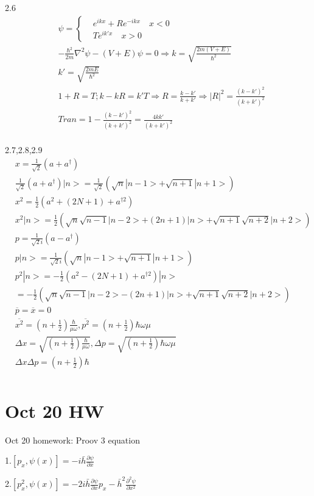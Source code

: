 \documentclass{article}
\begin{document}
  2.6\begin{align*}
  & \psi=\begin{cases}
    &e^{ikx}+Re^{-ikx}\quad x<0\\
    &Te^{ik'x} \quad x>0
  \end{cases}\\
  &-\frac{\hbar^2}{2m}\nabla^2 \psi-(V+E)\psi =0\Rightarrow k=\sqrt{\frac{2m(V+E)}{\hbar^2}}\\
  &k'=\sqrt{\frac{2mE}{\hbar^2}} \\
  &1+R=T;k-kR=k'T \Rightarrow R=\frac{k-k'}{k+k'}\Rightarrow |R|^2=\frac{(k-k')^2}{(k+k')^2}\\
  &Tran=1-\frac{(k-k')^2}{(k+k')^2}=
  \frac{4kk'}{(k+k')^2}\\
  \end{align*}

  2.7,2.8,2.9\begin{align*}
  & x=\frac1{\sqrt{2}}(a+a^{\dagger}) \\
  &\frac1{\sqrt{2}}(a+a^{\dagger})|n>=\frac1{\sqrt{2}}(\sqrt{n}|n-1>+\sqrt{n+1}|n+1>) \\
  &x^2=\frac12(a^2+(2N+1)+a^{\dagger2}) \\
  &x^2|n>=\frac12(\sqrt{n}\sqrt{n-1}|n-2>+(2n+1)|n>+\sqrt{n+1}\sqrt{n+2}|n+2>) \\
  &p=\frac1{\sqrt{2}i}(a-a^{\dagger}) \\
  & p|n>=\frac1{\sqrt{2}i}(\sqrt{n}|n-1>+\sqrt{n+1}|n+1>)\\
  &p^2 |n>=-\frac12(a^2-(2N+1)+a^{\dagger2})|n>\\& =-\frac12(\sqrt{n}\sqrt{n-1}|n-2>-(2n+1)|n>+\sqrt{n+1}\sqrt{n+2}|n+2>) \\
  &\overline{p}=\overline{x}=0 \\
  &\overline{x^2}=(n+\frac12)\frac{\hbar}{\mu\omega},\overline{p^2}=(n+\frac12)\hbar\omega\mu \\
  &\Delta x=\sqrt{(n+\frac12)\frac{\hbar}{\mu\omega}},\Delta p=\sqrt{(n+\frac12)\hbar\omega\mu} \\
  &\Delta x\Delta p=(n+\frac12)\hbar \\
  \end{align*}
 \section{Oct 20 HW}
Oct 20 homework: Proov 3 equation 

1.$[p_x , \psi(x)]=-i\bar h \frac{\partial \psi}{\partial x}$

2.$[p_x^2 , \psi(x)]=-2i\bar h \frac{\partial \psi}{\partial x}p_x-{\bar h}^2\frac{\partial^2 \psi}{\partial x^2}$
\end{document}
